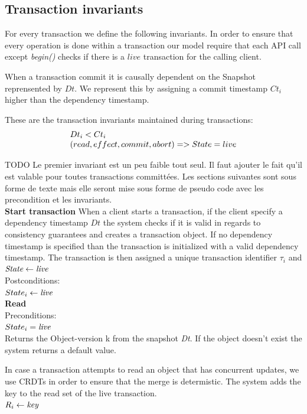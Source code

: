 \documentclass[systeme]{compas2022}
\begin{document}
\subsection{Transaction invariants}

For every transaction we define the following invariants.
In order to ensure that every operation is done within a transaction our model require that each API call except \emph{begin()} checks if there is a $live$ transaction for the calling client.

When a transaction commit it is causally dependent on the Snapshot reprensented by $Dt$.
We represent this by assigning a commit timestamp $Ct_i$ higher than the dependency timestamp.

These are the transaction invariants maintained during transactions:
\[
  \begin{array}{lcl}
    \emph{$Dt_i < Ct_i$}\\
    \emph{$(read, effect, commit, abort) => State = live$}
  \end{array} 
\]


TODO Le premier invariant est un peu faible tout seul. Il faut ajouter le fait qu'il est valable pour toutes transactions committées. Les sections suivantes sont sous forme de texte mais elle seront mise sous forme de pseudo code avec les precondition et les invariants.\\


\textbf{Start transaction}
When a client starts a transaction, if the client specify a dependency timestamp $Dt$ the system checks if it is valid in regards to consistency guarantees and creates a transaction object.
If no dependency timestamp is specified than the transaction is initialized with a valid dependency timestamp.
The transaction is then assigned a unique transaction identifier $\tau_i$ and $\emph{State} \leftarrow \emph{live}$ \\

Postconditions:\\
$State_i \leftarrow \emph{live}$ \\


\textbf{Read}\\
Preconditions:\\ 
$State_i = \emph{live}$ \\

Returns the Object-version k from the snapshot \emph{Dt}. 
If the object doesn't exist the system returns a default value.

In case a transaction attempts to read an object that has concurrent updates, we use CRDTs in order to ensure that the merge is determistic.
The system adds the key to the read set of the live transaction.\\
$R_i \leftarrow \emph{key}$\\
\end{document}
